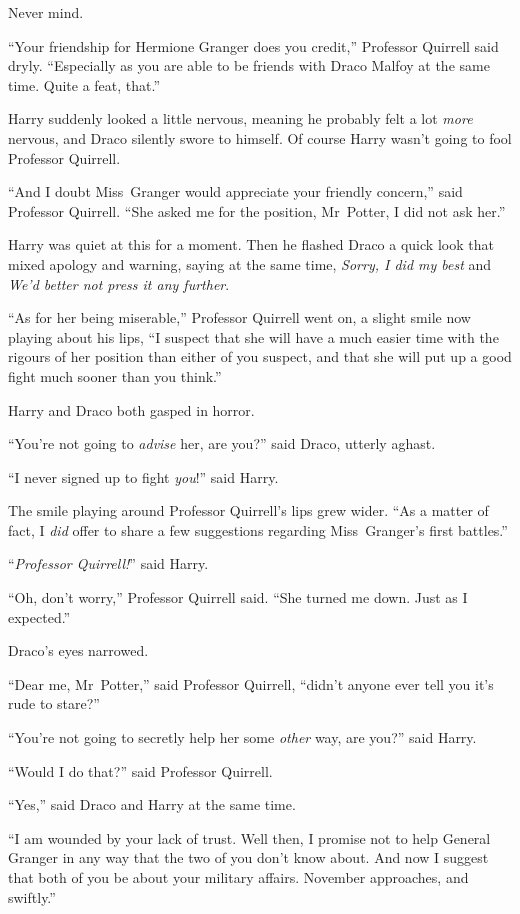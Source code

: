 Never mind.

“Your friendship for Hermione Granger does you credit,” Professor Quirrell said dryly.
“Especially as you are able to be friends with Draco Malfoy at the same time. Quite a feat, that.”

Harry suddenly looked a little nervous, meaning he probably felt a lot \emph{more} nervous, and Draco silently swore to himself. Of course Harry wasn’t going to fool Professor Quirrell.

“And I doubt Miss~Granger would appreciate your friendly concern,” said Professor Quirrell.
“She asked me for the position, Mr~Potter, I did not ask her.”

Harry was quiet at this for a moment. Then he flashed Draco a quick look that mixed apology and warning, saying at the same time, \emph{Sorry, I did my best} and \emph{We’d better not press it any further}.

“As for her being miserable,” Professor Quirrell went on, a slight smile now playing about his lips,
“I suspect that she will have a much easier time with the rigours of her position than either of you suspect, and that she will put up a good fight much sooner than you think.”

Harry and Draco both gasped in horror.

“You’re not going to \emph{advise} her, are you?” said Draco, utterly aghast.

“I never signed up to fight \emph{you}!” said Harry.

The smile playing around Professor Quirrell’s lips grew wider.
“As a matter of fact, I \emph{did} offer to share a few suggestions regarding Miss~Granger’s first battles.”

“\emph{Professor Quirrell!}” said Harry.

“Oh, don’t worry,” Professor Quirrell said.
“She turned me down. Just as I expected.”

Draco’s eyes narrowed.

“Dear me, Mr~Potter,” said Professor Quirrell, “didn’t anyone ever tell you it’s rude to stare?”

“You’re not going to secretly help her some \emph{other} way, are you?” said Harry.

“Would I do that?” said Professor Quirrell.

“Yes,” said Draco and Harry at the same time.

“I am wounded by your lack of trust. Well then, I promise not to help General Granger in any way that the two of you don’t know about. And now I suggest that both of you be about your military affairs. November approaches, and swiftly.”

